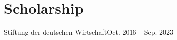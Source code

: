 \section{Scholarship}

\HeadingsStart

\HeadingOneLine
{Stiftung der deutschen Wirtschaft}{Oct. 2016 -- Sep. 2023}

\ItemsStart
{}
\ItemsEnd

\HeadingsEnd